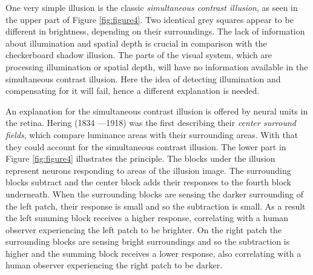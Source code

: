 One very simple illusion is the classic \emph{simultaneous contrast illusion}, as seen in
the upper part of Figure \ref{fig:figure4}. Two identical grey squares appear to be
different in brightness, depending on their surroundings. The lack of information about
illumination and spatial depth is crucial in comparison with the checkerboard shadow
illusion. The parts of the visual system, which are processing illumination or spatial
depth, will have no information available in the simultaneous contrast illusion. Here the
idea of detecting illumination and compensating for it will fail, hence a different
explanation is needed.

An explanation for the simultaneous contrast illusion is offered by neural units in the
retina. Hering (1834 —1918) was the first describing their \emph{center surround fields},
which compare luminance areas with their surrounding areas. With that
they could account for the simultaneous contrast illusion. The lower part in Figure
\ref{fig:figure4} illustrates the principle. The blocks under the illusion represent
neurons responding to areas of the illusion image. The surrounding blocks subtract and the
center block adds their responses to the fourth block underneath. When the surrounding
blocks are sensing the darker surrounding of the left patch, their response is small and
so the subtraction is small. As a result the left summing block receives a higher
response, correlating with a human observer experiencing the left patch to be brighter. On
the right patch the surrounding blocks are sensing bright surroundings and so the
subtraction is higher and the summing block receives a lower response, also correlating
with a human observer experiencing the right patch to be darker.


